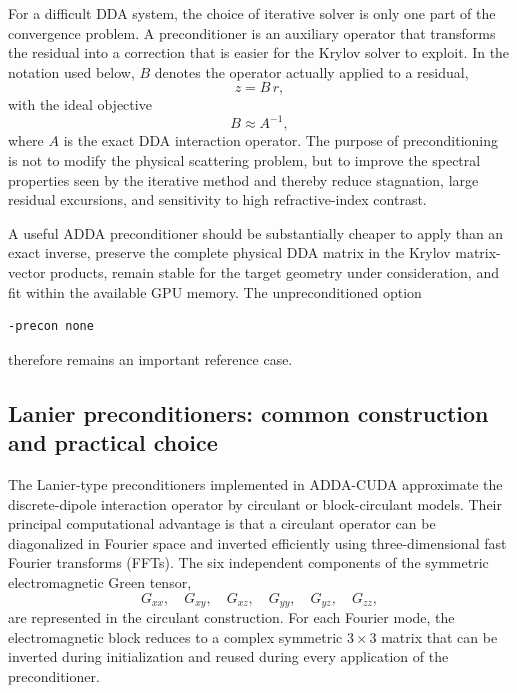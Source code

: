 \documentclass[11pt,a4paper]{article}
\begin{document}
For a difficult DDA system, the choice of iterative solver is only one part of the convergence problem. A preconditioner is an auxiliary operator that transforms the residual into a correction that is easier for the Krylov solver to exploit. In the notation used below, \(B\) denotes the operator actually applied to a residual,
\begin{equation}
z=B\,r,
\end{equation}
with the ideal objective
\begin{equation}
B\approx A^{-1},
\end{equation}
where \(A\) is the exact DDA interaction operator. The purpose of preconditioning is not to modify the physical scattering problem, but to improve the spectral properties seen by the iterative method and thereby reduce stagnation, large residual excursions, and sensitivity to high refractive-index contrast.

A useful ADDA preconditioner should be substantially cheaper to apply than an exact inverse, preserve the complete physical DDA matrix in the Krylov matrix-vector products, remain stable for the target geometry under consideration, and fit within the available GPU memory. The unpreconditioned option
\begin{verbatim}
-precon none
\end{verbatim}
therefore remains an important reference case.

\subsection{Lanier preconditioners: common construction and practical choice}

The Lanier-type preconditioners implemented in ADDA-CUDA approximate the discrete-dipole interaction operator by circulant or block-circulant models. Their principal computational advantage is that a circulant operator can be diagonalized in Fourier space and inverted efficiently using three-dimensional fast Fourier transforms (FFTs). The six independent components of the symmetric electromagnetic Green tensor,
\begin{equation}
G_{xx},\quad G_{xy},\quad G_{xz},\quad
G_{yy},\quad G_{yz},\quad G_{zz},
\end{equation}
are represented in the circulant construction. For each Fourier mode, the electromagnetic block reduces to a complex symmetric \(3\times3\) matrix that can be inverted during initialization and reused during every application of the preconditioner.
\end{document}
